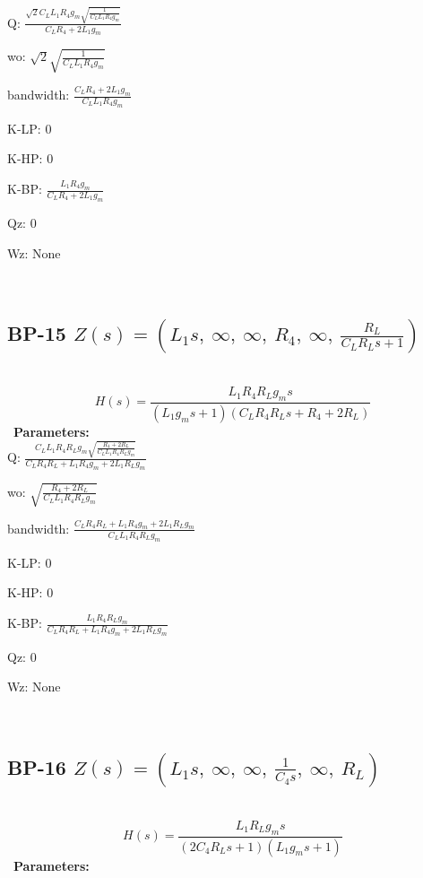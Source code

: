 \documentclass{article}
\begin{document}
Q: $\frac{\sqrt{2} C_{L} L_{1} R_{4} g_{m} \sqrt{\frac{1}{C_{L} L_{1} R_{4} g_{m}}}}{C_{L} R_{4} + 2 L_{1} g_{m}}$\ 

wo: $\sqrt{2} \sqrt{\frac{1}{C_{L} L_{1} R_{4} g_{m}}}$\ 

bandwidth: $\frac{C_{L} R_{4} + 2 L_{1} g_{m}}{C_{L} L_{1} R_{4} g_{m}}$\ 

K-LP: $0$\ 

K-HP: $0$\ 

K-BP: $\frac{L_{1} R_{4} g_{m}}{C_{L} R_{4} + 2 L_{1} g_{m}}$\ 

Qz: $0$\ 

Wz: $\text{None}$\ 

\ 

\subsection{BP-15 $Z(s) = \left( L_{1} s, \  \infty, \  \infty, \  R_{4}, \  \infty, \  \frac{R_{L}}{C_{L} R_{L} s + 1}\right)$ } \ 
\textbf{\[H(s) = \frac{L_{1} R_{4} R_{L} g_{m} s}{\left(L_{1} g_{m} s + 1\right) \left(C_{L} R_{4} R_{L} s + R_{4} + 2 R_{L}\right)}\] } \ 
\textbf{Parameters:}\\ 

Q: $\frac{C_{L} L_{1} R_{4} R_{L} g_{m} \sqrt{\frac{R_{4} + 2 R_{L}}{C_{L} L_{1} R_{4} R_{L} g_{m}}}}{C_{L} R_{4} R_{L} + L_{1} R_{4} g_{m} + 2 L_{1} R_{L} g_{m}}$\ 

wo: $\sqrt{\frac{R_{4} + 2 R_{L}}{C_{L} L_{1} R_{4} R_{L} g_{m}}}$\ 

bandwidth: $\frac{C_{L} R_{4} R_{L} + L_{1} R_{4} g_{m} + 2 L_{1} R_{L} g_{m}}{C_{L} L_{1} R_{4} R_{L} g_{m}}$\ 

K-LP: $0$\ 

K-HP: $0$\ 

K-BP: $\frac{L_{1} R_{4} R_{L} g_{m}}{C_{L} R_{4} R_{L} + L_{1} R_{4} g_{m} + 2 L_{1} R_{L} g_{m}}$\ 

Qz: $0$\ 

Wz: $\text{None}$\ 

\ 

\subsection{BP-16 $Z(s) = \left( L_{1} s, \  \infty, \  \infty, \  \frac{1}{C_{4} s}, \  \infty, \  R_{L}\right)$ } \ 
\textbf{\[H(s) = \frac{L_{1} R_{L} g_{m} s}{\left(2 C_{4} R_{L} s + 1\right) \left(L_{1} g_{m} s + 1\right)}\] } \ 
\textbf{Parameters:}\\ 
\end{document}
